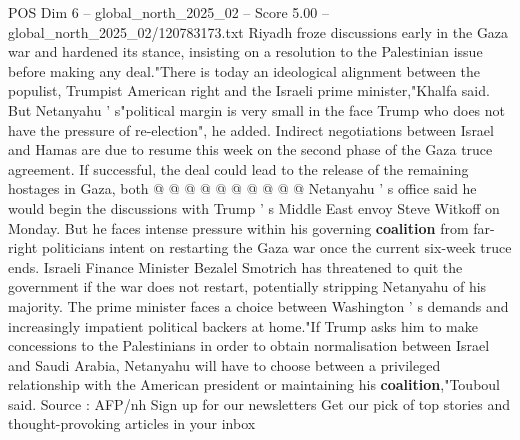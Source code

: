 \begin{textsample}{POS Dim 6 – global\_north\_2025\_02 – Score 5.00 – global\_north\_2025\_02/120783173.txt}
Riyadh froze discussions early in the Gaza war and hardened its stance, insisting on a resolution to the Palestinian issue before making any deal."There is today an ideological alignment between the populist, Trumpist American right and the Israeli prime minister,"Khalfa said.
But Netanyahu ' s"political margin is very small in the face Trump who does not have the pressure of re-election", he added.
Indirect negotiations between Israel and Hamas are due to resume this week on the second phase of the Gaza truce agreement.
If successful, the deal could lead to the release of the remaining hostages in Gaza, both @ @ @ @ @ @ @ @ @ @ Netanyahu ' s office said he would begin the discussions with Trump ' s Middle East envoy Steve Witkoff on Monday.
But he faces intense pressure within his governing \textbf{coalition} from far-right politicians intent on restarting the Gaza war once the current six-week truce ends.
Israeli Finance Minister Bezalel Smotrich has threatened to quit the government if the war does not restart, potentially stripping Netanyahu of his majority.
The prime minister faces a choice between Washington ' s demands and increasingly impatient political backers at home."If Trump asks him to make concessions to the Palestinians in order to obtain normalisation between Israel and Saudi Arabia, Netanyahu will have to choose between a privileged relationship with the American president or maintaining his \textbf{coalition},"Touboul said.
Source : AFP/nh Sign up for our newsletters Get our pick of top stories and thought-provoking articles in your inbox

\end{textsample}
